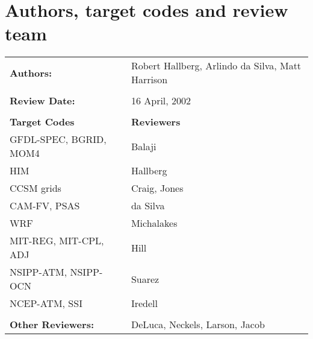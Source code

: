 \section{Authors, target codes and review team}

\begin{tabular}{l l}

{\bf Authors:} & Robert Hallberg, Arlindo da Silva, Matt Harrison \\ \\

{\bf Review Date:}            & 16 April, 2002 \\ \\

{\bf Target Codes}            & {\bf Reviewers} \\
GFDL-SPEC, BGRID, MOM4        & Balaji \\ 
HIM                           & Hallberg \\
CCSM grids                    & Craig, Jones \\
CAM-FV, PSAS                  & da Silva\\
WRF                           & Michalakes \\
MIT-REG, MIT-CPL, ADJ         & Hill \\
NSIPP-ATM, NSIPP-OCN          & Suarez \\
NCEP-ATM, SSI                 & Iredell \\ \\

{\bf Other Reviewers:}        & DeLuca, Neckels, Larson, Jacob

\end{tabular}


%



%

